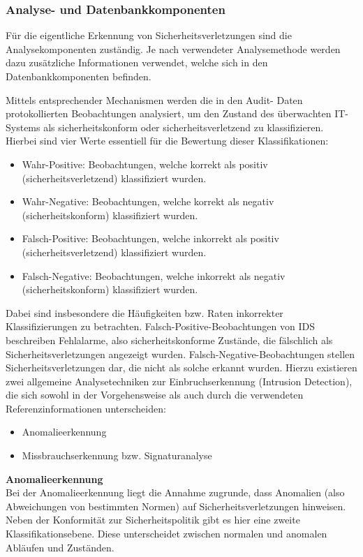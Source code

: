 \documentclass[11pt]{scrartcl}
\begin{document}
\subsubsection{Analyse- und Datenbankkomponenten}
\label{sec:analyse und db}
Für die eigentliche Erkennung von Sicherheitsverletzungen sind die Analysekomponenten zuständig. Je nach verwendeter Analysemethode werden dazu zusätzliche
Informationen verwendet, welche sich in den Datenbankkomponenten befinden.

Mittels entsprechender Mechanismen werden die in den Audit-
Daten protokollierten Beobachtungen analysiert, um den Zustand des
überwachten IT-Systems als sicherheitskonform oder sicherheitsverletzend zu
klassifizieren. Hierbei sind vier Werte essentiell für die Bewertung dieser Klassifikationen:\\
\begin{itemize}
\item Wahr-Positive: Beobachtungen, welche korrekt als positiv
(sicherheitsverletzend) klassifiziert wurden.

\item Wahr-Negative: Beobachtungen, welche korrekt als negativ
(sicherheitskonform) klassifiziert wurden.

\item Falsch-Positive: Beobachtungen, welche inkorrekt als positiv
(sicherheitsverletzend) klassifiziert wurden.

\item Falsch-Negative: Beobachtungen, welche inkorrekt als
negativ (sicherheitskonform) klassifiziert wurden.
\end{itemize}
Dabei sind insbesondere die Häufigkeiten bzw. Raten inkorrekter Klassifizierungen zu betrachten.
Falsch-Positive-Beobachtungen von IDS beschreiben Fehlalarme,
also sicherheitskonforme Zustände, die fälschlich als Sicherheitsverletzungen
angezeigt wurden. Falsch-Negative-Beobachtungen stellen Sicherheitsverletzungen dar, die
nicht als solche erkannt wurden.
Hierzu existieren zwei allgemeine Analysetechniken zur Einbruchserkennung (Intrusion Detection), die sich sowohl in der Vorgehensweise als auch durch die verwendeten Referenzinformationen unterscheiden:
\begin{itemize}
\item Anomalieerkennung 
\item Missbrauchserkennung bzw. Signaturanalyse
\end{itemize}
\textbf{Anomalieerkennung}\\
Bei der Anomalieerkennung liegt die Annahme zugrunde, dass Anomalien (also Abweichungen von bestimmten Normen) auf Sicherheitsverletzungen hinweisen. Neben der Konformität zur Sicherheitspolitik gibt es hier eine zweite Klassifikationsebene. Diese unterscheidet zwischen normalen und anomalen Abläufen und Zuständen.
\end{document}
